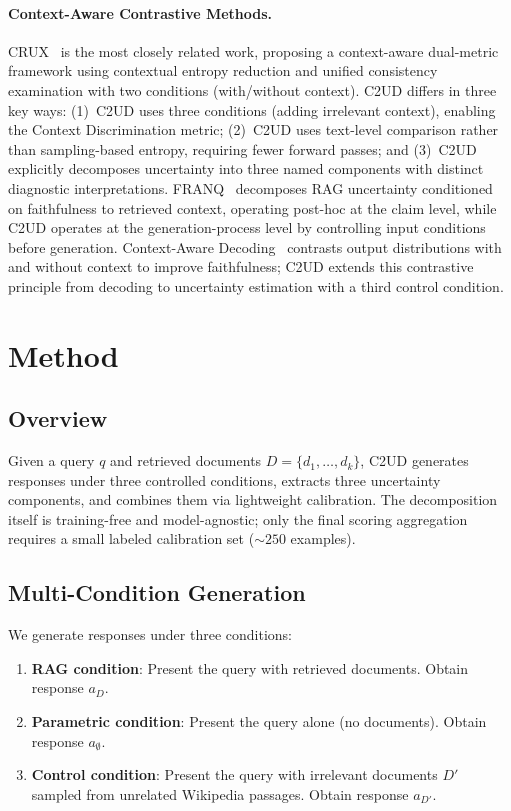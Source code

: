 \documentclass{article}
\newcommand{\ours}{\textsc{C2UD}}
\begin{document}
\paragraph{Context-Aware Contrastive Methods.}
CRUX~\citep{yuan2026crux} is the most closely related work, proposing a context-aware dual-metric framework using contextual entropy reduction and unified consistency examination with two conditions (with/without context).
\ours{} differs in three key ways: (1)~\ours{} uses three conditions (adding irrelevant context), enabling the Context Discrimination metric; (2)~\ours{} uses text-level comparison rather than sampling-based entropy, requiring fewer forward passes; and (3)~\ours{} explicitly decomposes uncertainty into three named components with distinct diagnostic interpretations.
FRANQ~\citep{fadeeva2025franq} decomposes RAG uncertainty conditioned on faithfulness to retrieved context, operating post-hoc at the claim level, while \ours{} operates at the generation-process level by controlling input conditions before generation.
Context-Aware Decoding~\citep{shi-etal-2024-trusting} contrasts output distributions with and without context to improve faithfulness; \ours{} extends this contrastive principle from decoding to uncertainty estimation with a third control condition.

\section{Method}
\label{sec:method}

\subsection{Overview}

Given a query $q$ and retrieved documents $D = \{d_1, \ldots, d_k\}$, \ours{} generates responses under three controlled conditions, extracts three uncertainty components, and combines them via lightweight calibration.
The decomposition itself is training-free and model-agnostic; only the final scoring aggregation requires a small labeled calibration set (${\sim}250$ examples).

\subsection{Multi-Condition Generation}

We generate responses under three conditions:
\begin{enumerate}
    \item \textbf{RAG condition}: Present the query with retrieved documents. Obtain response $a_D$.
    \item \textbf{Parametric condition}: Present the query alone (no documents). Obtain response $a_\emptyset$.
    \item \textbf{Control condition}: Present the query with irrelevant documents $D'$ sampled from unrelated Wikipedia passages. Obtain response $a_{D'}$.
\end{enumerate}
\end{document}
